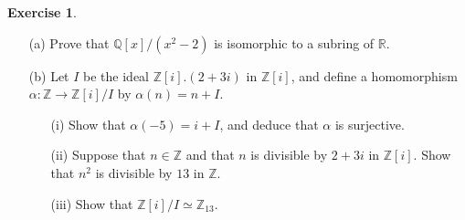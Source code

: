 \documentclass{amsart}
\newcommand{\Q}         {{\mathbb{Q}}}
\newcommand{\R}         {{\mathbb{R}}}
\newcommand{\Z}         {{\mathbb{Z}}}
\newcommand{\al}        {\alpha}
\newcommand{\tm}        {\times}
\newcommand{\xra}       {\xrightarrow}
\newcommand{\ip}[1]     {\langle #1\rangle}
\renewcommand{\:}{\colon}
\theoremstyle{definition}
\newtheorem{exercise}{Exercise}[section]
\begin{document}
\begin{exercise}
 \begin{itemize}
  \item[(a)] Prove that $\Q[x]/(x^2-2)$ is isomorphic to a subring of
   $\R$.
  \item[(b)] Let $I$ be the ideal $\Z[i].(2+3i)$ in $\Z[i]$, and
   define a homomorphism $\al\:\Z\xra{}\Z[i]/I$ by $\al(n)=n+I$.
   \begin{itemize}
   \item[(i)] Show that $\al(-5)=i+I$, and deduce that $\al$ is
    surjective.
   \item[(ii)] Suppose that $n\in\Z$ and that $n$ is divisible by
    $2+3i$ in $\Z[i]$.  Show that $n^2$ is divisible by $13$ in $\Z$.
   \item[(iii)] Show that $\Z[i]/I\simeq \Z_{13}$.
   \end{itemize}
 \end{itemize}
\end{exercise}
\end{document}

